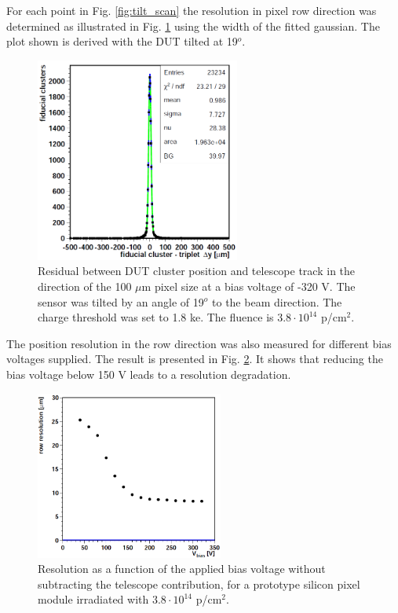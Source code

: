 For each point in Fig. \ref{fig:tilt_scan} the resolution in pixel row direction was determined as illustrated in Fig. \ref{fig:resol} using the 
width of the fitted gaussian. The plot shown is derived with the DUT tilted at 19$^{o}$.

\begin{figure}[t]
 \centering
 \includegraphics[width=0.6\textwidth]{021_pixel_upgrade/plots/resol_dist.png}
 \caption{Residual between DUT cluster position and telescope track in the direction of the 100 $\mu$m pixel size at a bias voltage of -320 V. The sensor 
 was tilted by an angle of 19$^{o}$ to the beam direction. The charge threshold was set to 1.8 ke. The fluence is $3.8 \cdot 10^{14}$ p/cm$^2$.}
 \label{fig:resol}
\end{figure}

The position resolution in the row direction was also measured for different bias voltages supplied. The result is presented in Fig. \ref{fig:bias_res}.
It shows that reducing the bias voltage below 150 V leads to a resolution degradation.

\begin{figure}[t]
 \centering
 \includegraphics[width=0.55\textwidth]{021_pixel_upgrade/plots/bias_resol.png}
 \caption{Resolution as a function of the applied bias voltage without subtracting the telescope contribution, for a prototype silicon pixel module 
 irradiated with $3.8 \cdot 10^{14}$ p/cm$^2$.}
 \label{fig:bias_res}
\end{figure}

